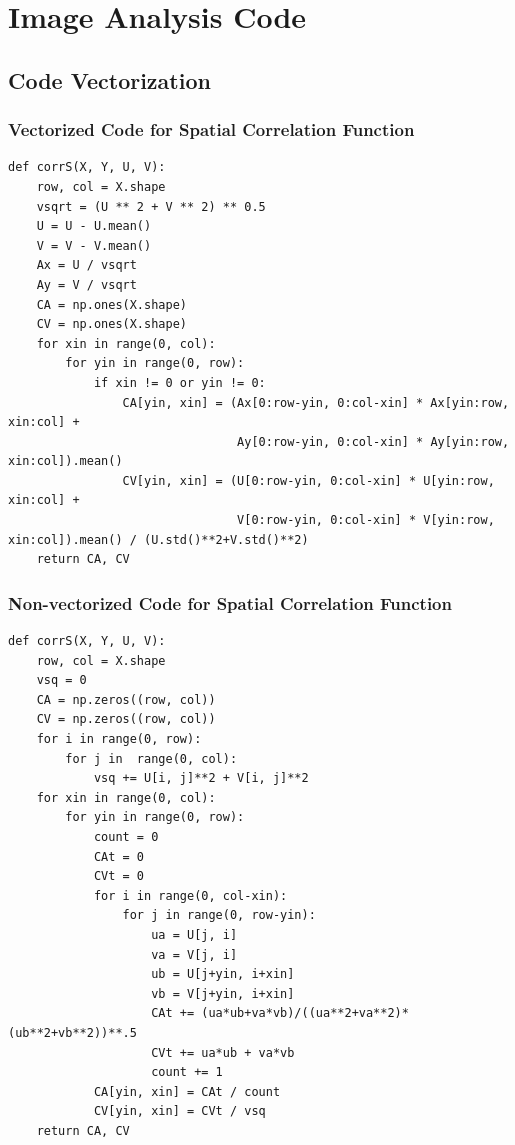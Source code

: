 \chapter{Image Analysis Code}

\section{Code Vectorization}
\subsection{Vectorized Code for Spatial Correlation Function}
\label{sec:A-vectorization}
\begin{verbatim}
def corrS(X, Y, U, V):
    row, col = X.shape
    vsqrt = (U ** 2 + V ** 2) ** 0.5
    U = U - U.mean()
    V = V - V.mean()
    Ax = U / vsqrt
    Ay = V / vsqrt
    CA = np.ones(X.shape)
    CV = np.ones(X.shape)
    for xin in range(0, col):
        for yin in range(0, row):
            if xin != 0 or yin != 0:
                CA[yin, xin] = (Ax[0:row-yin, 0:col-xin] * Ax[yin:row, xin:col] +
                                Ay[0:row-yin, 0:col-xin] * Ay[yin:row, xin:col]).mean()
                CV[yin, xin] = (U[0:row-yin, 0:col-xin] * U[yin:row, xin:col] +
                                V[0:row-yin, 0:col-xin] * V[yin:row, xin:col]).mean() / (U.std()**2+V.std()**2)
    return CA, CV
\end{verbatim}

\subsection{Non-vectorized Code for Spatial Correlation Function}
\begin{verbatim}
def corrS(X, Y, U, V):
    row, col = X.shape
    vsq = 0
    CA = np.zeros((row, col))
    CV = np.zeros((row, col))
    for i in range(0, row):
        for j in  range(0, col):
            vsq += U[i, j]**2 + V[i, j]**2
    for xin in range(0, col):
        for yin in range(0, row):
            count = 0
            CAt = 0
            CVt = 0
            for i in range(0, col-xin):
                for j in range(0, row-yin):
                    ua = U[j, i]
                    va = V[j, i]
                    ub = U[j+yin, i+xin]
                    vb = V[j+yin, i+xin]
                    CAt += (ua*ub+va*vb)/((ua**2+va**2)*(ub**2+vb**2))**.5
                    CVt += ua*ub + va*vb
                    count += 1
            CA[yin, xin] = CAt / count
            CV[yin, xin] = CVt / vsq
    return CA, CV
\end{verbatim}


